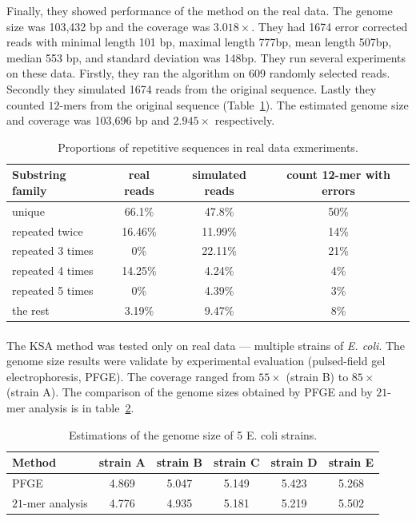 Finally, they showed performance of the method on the real data.
The genome size was 103,432 bp and the coverage was $3.018\times$.
They had 1674 error corrected reads with minimal length 101 bp, maximal length 777bp, mean length 507bp, median 553 bp, and standard deviation was 148bp.
They run several experiments on these data. Firstly, they ran the algorithm on 609 randomly selected reads. Secondly they simulated 1674 reads from the original sequence. Lastly they counted $12$-mers from the original sequence (Table~\ref{tab:waterman3}).
The estimated genome size and coverage was 103,696 bp and $2.945\times$ respectively.
\begin{table}[htbp]
\centering
\begin{tabular}{lccc}
\toprule
Substring family & real reads & simulated reads & count 12-mer with errors\\
\midrule
unique & 66.1\% & 47.8\% & 50\% \\
repeated twice & 16.46\% & 11.99\% & 14\% \\
repeated 3 times & 0\% & 22.11\% & 21\% \\
repeated 4 times & 14.25\% & 4.24\% & 4\% \\
repeated 5 times & 0\% & 4.39\% & 3\% \\
the rest & 3.19\% & 9.47\% & 8\% \\
\bottomrule
\end{tabular}
\caption[Proportions of repetitive sequences in real data exmeriments]{Proportions of repetitive sequences in real data exmeriments.\cite{waterman}}\label{tab:waterman3}
\end{table}

\paragraph{}The KSA method\cite{williams} was tested only on real data --- multiple strains of \emph{E. coli}. The genome size results were validate by experimental evaluation (pulsed-field gel electrophoresis, PFGE). The coverage ranged from $55\times$ (strain B) to $85\times$ (strain A). The comparison of the genome sizes obtained by PFGE and by $21$-mer analysis is in table~\ref{tab:williams}. 
\begin{table}[htbp]
\centering
\begin{tabular}{lccccc}
\toprule
Method & strain A & strain B & strain C & strain D & strain E\\
\midrule
PFGE & 4.869 & 5.047 & 5.149 & 5.423 & 5.268\\
$21$-mer analysis & 4.776 & 4.935 & 5.181 & 5.219 & 5.502\\
\bottomrule
\end{tabular}
\caption[Estimations of the genome size of 5 E. coli strains]{Estimations of the genome size of 5 E. coli strains.\cite{williams}}\label{tab:williams}
\end{table}

